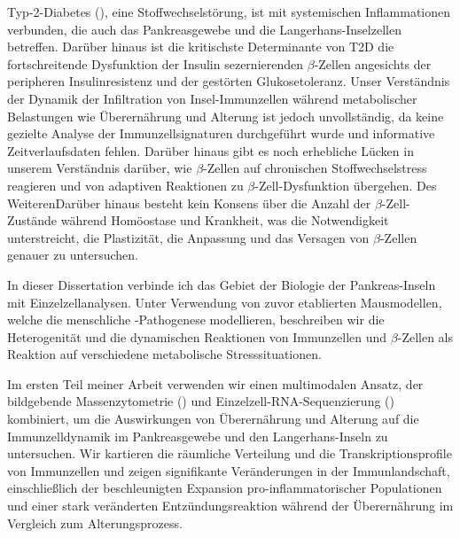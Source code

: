 \begin{zusammen}

\par Typ-2-Diabetes (), eine Stoffwechselstörung, ist mit systemischen Inflammationen verbunden, die auch das Pankreasgewebe und die Langerhans-Inselzellen betreffen. Darüber hinaus ist die kritischste Determinante von T2D die fortschreitende Dysfunktion der Insulin sezernierenden $\beta$-Zellen angesichts der peripheren Insulinresistenz und der gestörten Glukosetoleranz. Unser Verständnis der Dynamik der Infiltration von Insel-Immunzellen während metabolischer Belastungen wie Überernährung und Alterung ist jedoch unvollständig, da keine gezielte Analyse der Immunzellsignaturen durchgeführt wurde und informative Zeitverlaufsdaten fehlen. Darüber hinaus gibt es noch erhebliche Lücken in unserem Verständnis darüber, wie $\beta$-Zellen auf chronischen Stoffwechselstress reagieren und von adaptiven Reaktionen zu $\beta$-Zell-Dysfunktion übergehen. Des WeiterenDarüber hinaus besteht kein Konsens über die Anzahl der $\beta$-Zell-Zustände während Homöostase und Krankheit, was die Notwendigkeit unterstreicht, die Plastizität, die Anpassung und das Versagen von $\beta$-Zellen genauer zu untersuchen.\\

\par In dieser Dissertation verbinde ich das Gebiet der Biologie der Pankreas-Inseln mit Einzelzellanalysen. Unter Verwendung von zuvor etablierten Mausmodellen, welche die menschliche -Pathogenese modellieren, beschreiben wir die Heterogenität und die dynamischen Reaktionen von Immunzellen und $\beta$-Zellen als Reaktion auf verschiedene metabolische Stresssituationen.\\

\par Im ersten Teil meiner Arbeit verwenden wir einen multimodalen Ansatz, der bildgebende Massenzytometrie () und Einzelzell-RNA-Sequenzierung () kombiniert, um die Auswirkungen von Überernährung und Alterung auf die Immunzelldynamik im Pankreasgewebe und den Langerhans-Inseln zu untersuchen. Wir kartieren die räumliche Verteilung und die Transkriptionsprofile von Immunzellen und zeigen signifikante Veränderungen in der Immunlandschaft, einschließlich der beschleunigten Expansion pro-inflammatorischer Populationen und einer stark veränderten Entzündungsreaktion während der Überernährung im Vergleich zum Alterungsprozess.\\


\end{zusammen}
